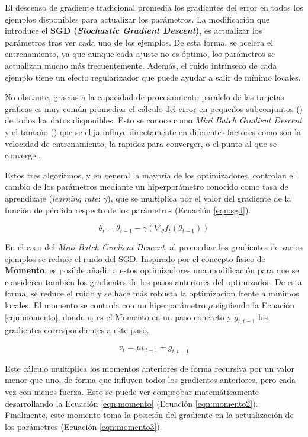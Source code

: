 El descenso de gradiente tradicional promedia los gradientes del error en todos los ejemplos disponibles para actualizar los parámetros. La modificación que introduce el \textbf{SGD (\textit{Stochastic Gradient Descent})}, es actualizar los parámetros tras ver cada uno de los ejemplos. De esta forma, se acelera el entrenamiento, ya que aunque cada ajuste no es óptimo, los parámetros se actualizan mucho más frecuentemente. Además, el ruido intrínseco de cada ejemplo tiene un efecto regularizador que puede ayudar a salir de mínimo locales.

No obstante, gracias a la capacidad de procesamiento paralelo de las tarjetas gráficas es muy común promediar el cálculo del error en pequeños subconjuntos () de todos los datos disponibles. Esto se conoce como \textit{Mini Batch Gradient Descent} y el tamaño () que se elija influye directamente en diferentes factores como son la velocidad de entrenamiento, la rapidez para converger, o el punto al que se converge \cite{on-large-batch}.

Estos tres algoritmos, y en general la mayoría de los optimizadores, controlan el cambio de los parámetros mediante un hiperparámetro conocido como tasa de aprendizaje (\textit{learning rate}: $\gamma$), que se multiplica por el valor del gradiente de la función de pérdida respecto de los parámetros (Ecuación \ref{eqn:sgd}).

\begin{equation}
\label{eqn:sgd}
\theta_t = \theta_{t-1} - \gamma (\nabla_{\theta} f_t(\theta_{t-1}))
\end{equation}

En el caso del \textit{Mini Batch Gradient Descent}, al promediar los gradientes de varios ejemplos se reduce el ruido del SGD. Inspirado por el concepto físico de \textbf{Momento}, es posible añadir a estos optimizadores una modificación para que se consideren también los gradientes de los pasos anteriores del optimizador. De esta forma, se reduce el ruido y se hace más robusta la optimización frente a mínimos locales. El momento se controla con un hiperparámetro $\mu$ siguiendo la Ecuación \ref{eqn:momento}, donde $v_t$ es el Momento en un paso concreto y $g_{t, t-1}$ los gradientes correspondientes a este paso. 

\begin{equation}
\label{eqn:momento}
v_t = \mu v_{t-1} + g_{t, t-1}
\end{equation}

Este cálculo multiplica los momentos anteriores de forma recursiva por un valor menor que uno, de forma que influyen todos los gradientes anteriores, pero cada vez con menos fuerza. Esto se puede ver comprobar matemáticamente desarrollando la Ecuación \ref{eqn:momento} (Ecuación \ref{eqn:momento2}). Finalmente, este momento toma la posición del gradiente en la actualización de los parámetros (Ecuación \ref{eqn:momento3}).

